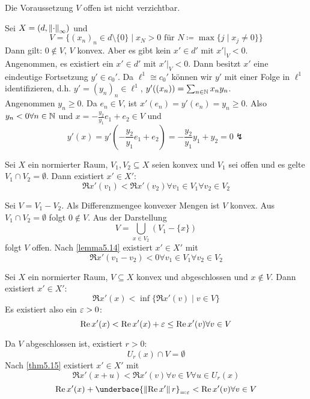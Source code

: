 \newpage
\begin{bemerkung*}
	Die Voraussetzung $ V $ offen ist nicht verzichtbar.
	\begin{beispiel*}
		Sei $ X=(d,\left\|\cdot\right\|_\infty) $ und \[ V=\lbrace (x_n)_n\in d\setminus\lbrace 0\rbrace\mid x_N>0\text{ f\"ur }N\coloneqq\max\lbrace j\mid x_j\neq 0\rbrace\rbrace \]
		Dann gilt: $ 0\notin V $, $ V $ konvex. Aber es gibt kein $ x'\in d' $ mit $ x'|_V<0 $.\\
		Angenommen, es existiert ein $ x'\in d' $ mit $ x'|_V<0 $. Dann besitzt $ x' $ eine eindeutige Fortsetzung $ y'\in c_0' $. Da $ \ell^1\cong c_0' $ k\"onnen wir $ y' $ mit einer Folge in $ \ell^1 $ identifizieren, d.h. $ y'=(y_n)_n\in\ell^1 $, $ y'((x_n))=\sum_{n\in\mathbb{N}}^{} x_ny_n $.\\
		Angenommen $ y_n\geq 0 $. Da $ e_n\in V $, ist $ x'(e_n)=y'(e_n)=y_n\geq 0 $. Also $ y_n<0\forall n\in\mathbb{N} $ und $ x=-\frac{y_2}{y_1}e_1+e_2\in V $ und
		\[ y'(x)=y'\left(-\frac{y_2}{y_1}e_1+e_2\right)=-\frac{y_2}{y_1}y_1+y_2=0\lightning \] 
	\end{beispiel*}
\end{bemerkung*}
\begin{theorem}
	Sei $  X $ ein normierter Raum, $ V_1,V_2\subseteq X $ seien konvex und $ V_1 $ sei offen und es gelte $ V_1\cap V_2=\emptyset $. Dann existiert $ x'\in X' $:
	\[ \Re x'(v_1)<\Re x'(v_2)\forall v_1\in V_1\forall v_2\in V_2 \] 
\end{theorem}
\begin{beweis}
	Sei $ V=V_1-V_2 $. Als Differenzmengee konvexer Mengen ist $ V $ konvex. Aus $ V_1\cap V_2=\emptyset $ folgt $ 0\notin V $. Aus der Darstellung
	\[ V=\bigcup_{x\in V_2}(V_1-\lbrace x\rbrace) \]
	folgt $ V $ offen. Nach \ref{lemma5.14} existiert $ x'\in X' $ mit
	\[ \Re x'(v_1-v_2)<0\forall v_1\in V_1\forall v_2\in V_2 \]
\end{beweis}
\newpage
\begin{theorem}
	Sei $ X $ ein normierter Raum, $ V\subseteq X $ konvex und abgeschlossen und $ x\notin V $. Dann existiert $ x'\in X' $:
	\[ \Re x'(x)<\inf\lbrace \Re x'(v)\mid v\in V\rbrace \]
	Es existiert also ein $ \varepsilon>0 $:
	\[ \operatorname{Re} x'(x)<\operatorname{Re} x'(x)+\varepsilon\leq\operatorname{Re} x'(v)\forall v\in V\]
\end{theorem}
\begin{beweis}
	Da $ V $ abgeschlossen ist, existiert $ r>0 $:
	\[ U_r(x)\cap V=\emptyset \]
	Nach \ref{thm5.15} existiert $ x'\in X' $ mit 
	\[ \Re x'(x+u)<\Re x'(v)\forall v\in V\forall u\in U_r(x) \]
	\[ \Re x'(x)+\underbace{\norm{\Re x'}r}_{\eqqcolon\e}<\Re x'(v)\forall v\in V \]
\end{beweis}